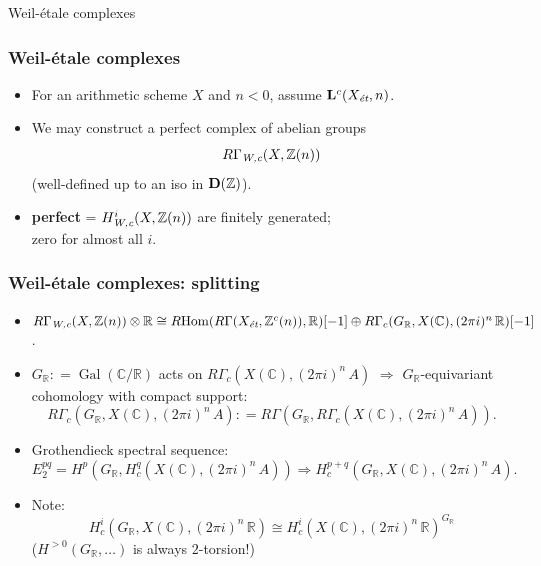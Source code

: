 \documentclass[handout]{beamer}
\newcommand{\ZZ}{\mathbb{Z}}
\newcommand{\RR}{\mathbb{R}}
\newcommand{\CC}{\mathbb{C}}
\newcommand{\isom}{\cong}
\newcommand{\dfn}{\mathrel{\mathop:}=}
\DeclareMathOperator{\Hom}{Hom}
\DeclareMathOperator{\Gal}{Gal}
\newcommand{\RHom}{R\!\Hom}
\newcommand{\categ}[1]{\text{\bf #1}}
\newcommand{\term}{\textbf}
\begin{document}
\begin{frame}[plain]
  \headingfont

  \vspace{\fill}

  \begin{center}
    {\huge Weil-étale complexes}
  \end{center}

  \vspace{\fill}
\end{frame}


\begin{frame}
  \frametitle{Weil-étale complexes}


  \begin{itemize}
  \item<3-> For an arithmetic scheme $X$ and $n < 0$, assume
    $\mathbf{L}^c (X_\text{\it ét}, n)$.

  \item<4-> We may construct a perfect complex of abelian groups
    $$R\Gamma_\text{\it W,c} (X, \ZZ (n))$$
    (well-defined up to an iso in $\categ{D} (\ZZ)$).

  \item<5-> \term{perfect} = $H^i_\text{\it W,c} (X, \ZZ (n))$ are finitely generated;\\
    zero for almost all $i$.
  \end{itemize}
\end{frame}


\begin{frame}
  \frametitle{Weil-étale complexes: splitting}

  \begin{itemize}
  \item<2-> $R\Gamma_\text{\it W,c} (X,\ZZ(n)) \otimes \RR \isom
    \RHom (R\Gamma (X_\text{\it ét}, \ZZ^c (n)), \RR) [-1] \oplus
    R\Gamma_c (G_\RR, X (\CC), (2\pi i)^n\,\RR) [-1]$.

  \item<3-> $G_\RR \dfn \Gal (\CC/\RR)$ acts on
    $R\Gamma_c (X (\CC), (2\pi i)^n\,A)$ $\Rightarrow$ $G_\RR$-equivariant
    cohomology with compact support:
    $$R\Gamma_c (G_\RR, X (\CC), (2\pi i)^n\,A) \dfn
    R\Gamma (G_\RR, R\Gamma_c (X (\CC), (2\pi i)^n\,A)).$$

  \item<4-> Grothendieck spectral sequence:
    $$E_2^{pq} = H^p (G_\RR, H^q_c (X (\CC), (2\pi i)^n\,A)) \Longrightarrow
    H^{p+q}_c (G_\RR, X (\CC), (2\pi i)^n\,A).$$

  \item<5-> Note:
    $$H_c^i (G_\RR, X (\CC), (2\pi i)^n\,\RR) \isom H_c^i (X (\CC), (2\pi i)^n\,\RR)^{G_\RR}$$
    ($H^{>0} (G_\RR, \ldots)$ is always $2$-torsion!)
  \end{itemize}
\end{frame}
\end{document}
